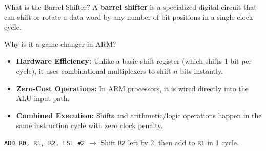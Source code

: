 \documentclass[9pt,aspectratio=169,xcolor=table]{beamer}
\begin{document}
\begin{frame}{What is the Barrel Shifter?}
	\leavevmode
	{\small A \textbf{barrel shifter} is a specialized digital circuit that can shift or rotate a data word by \alert{any number of bit positions in a single clock cycle}.}

	\vspace{2mm}
	\begin{block}{Why is it a game-changer in ARM?}
		\begin{itemize}
			\setlength{\itemsep}{2pt}
			\item \textbf{Hardware Efficiency:} Unlike a basic shift register (which shifts 1 bit per cycle), it uses combinational multiplexers to shift $n$ bits instantly.
			\item \textbf{Zero-Cost Operations:} In ARM processors, it is wired directly into the ALU input path.
			\item \textbf{Combined Execution:} Shifts and arithmetic/logic operations happen in the \alert{same instruction cycle} with zero clock penalty.
		\end{itemize}
	\end{block}

	\vspace{2mm}
	\begin{center}
		{\small \texttt{ADD R0, R1, R2, LSL \#2} \quad $\longrightarrow$ \quad Shift \texttt{R2} left by 2, then add to \texttt{R1} in \alert{1 cycle}.}
	\end{center}
\end{frame}
\end{document}
